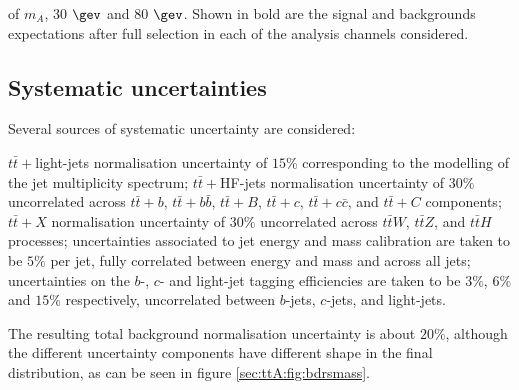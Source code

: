 \begin{table}[h]
\begin{center}
{{of $m_A$, 30 $\gev$ and 80 $\gev$. Shown in bold are the signal and backgrounds expectations after full selection in each of the analysis channels considered.}}
\label{sea:ttA:tab:yields} 
\end{center} 
\end{table} 



\subsection{Systematic uncertainties}

Several sources of systematic uncertainty are considered:

\bi
\ib $t\bar{t}+$light-jets normalisation uncertainty of $15\%$ corresponding to the modelling of the jet multiplicity spectrum;
\ib $t\bar{t}+$HF-jets normalisation uncertainty of $30\%$ uncorrelated across $t\bar{t}+b$, $t\bar{t}+b\bar{b}$, $t\bar{t}+B$, $t\bar{t}+c$, $t\bar{t}+c\bar{c}$, and $t\bar{t}+C$ components;
\ib $t\bar{t}+X$ normalisation uncertainty of $30\%$ uncorrelated across $t\bar{t}W$, $t\bar{t}Z$, and $t\bar{t}H$ processes;
\ib uncertainties associated to jet energy and mass calibration are taken to be $5\%$ per jet, fully correlated between energy and mass and across all jets;
\ib uncertainties  on  the $b$-, $c$-  and  light-jet  tagging  efficiencies  are  taken  to  be  $3\%$, $6\%$  and $15\%$  respectively, uncorrelated between $b$-jets, $c$-jets, and light-jets.
\ei


The resulting total background normalisation uncertainty is about $20\%$,  although the different uncertainty components have different shape in the final distribution, as can be seen in figure \ref{sec:ttA:fig:bdrsmass}.